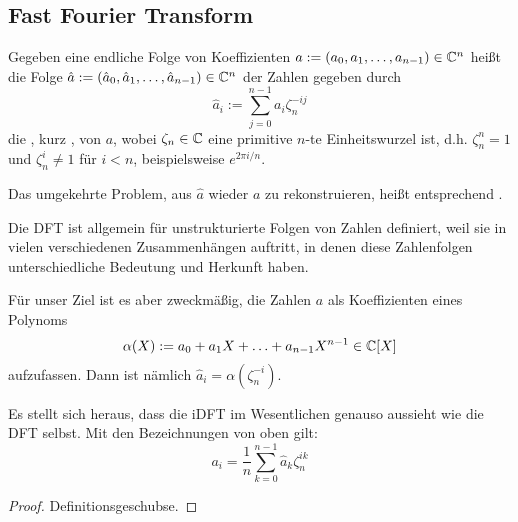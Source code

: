 
\subsection{Fast Fourier Transform}\label{sec:fft}

\begin{definition}[DFT]
    Gegeben eine endliche Folge von Koeffizienten $a:=(a_0,a_1,\ldots,a_{n-1})\in\mathbb{C}^n$ heißt die Folge $\hat{a}:=(\hat{a}_0,\hat{a}_1,\ldots,\hat{a}_{n-1})\in\mathbb{C}^n$ der Zahlen gegeben durch
    \[\hat{a}_i := \sum_{j=0}^{n-1} a_i \zeta_n^{-ij}\]
    die , kurz , von $a$, wobei $\zeta_n\in\mathbb{C}$ eine primitive $n$-te Einheitswurzel ist, d.h. $\zeta_n^n=1$ und $\zeta_n^i \neq 1$ für $i<n$, beispielsweise $e^{2\pi i / n}$.

    \medskip
    Das umgekehrte Problem, aus $\hat{a}$ wieder $a$ zu rekonstruieren, heißt entsprechend .
\end{definition}

\begin{remark}
    Die DFT ist allgemein für unstrukturierte Folgen von Zahlen definiert, weil sie in vielen verschiedenen Zusammenhängen auftritt, in denen diese Zahlenfolgen unterschiedliche Bedeutung und Herkunft haben.

    Für unser Ziel ist es aber zweckmäßig, die Zahlen $a$ als Koeffizienten eines Polynoms
    \[\alpha(X) := a_0 + a_1 X + \ldots + a_{n-1}X^{n-1} \in\mathbb{C}[X]\]
    aufzufassen. Dann ist nämlich $\hat{a}_i = \alpha(\zeta_n^{-i})$.
\end{remark}

\begin{lemma}
    Es stellt sich heraus, dass die iDFT im Wesentlichen genauso aussieht wie die DFT selbst. Mit den Bezeichnungen von oben gilt:
    \[a_i = \frac{1}{n}\sum_{k=0}^{n-1} \hat{a}_k \zeta_n^{ik}\]
\end{lemma}
\begin{proof}
    Definitionsgeschubse.
\end{proof}


